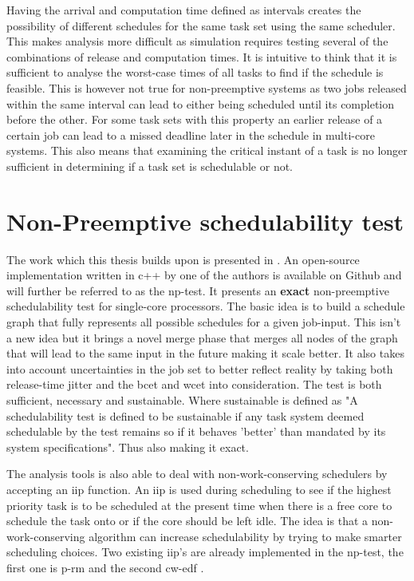 \documentclass{kththesis}
\begin{document}
Having the arrival and computation time defined as intervals creates the possibility of different
schedules for the same task set using the same scheduler. This makes analysis more difficult as
simulation requires testing several of the combinations of release and computation times. It is
intuitive to think that it is sufficient to analyse the worst-case times of all tasks to find if the
schedule is feasible. This is however not true for non-preemptive systems as two jobs released
within the same interval can lead to either being scheduled until its completion before the other.
For some task sets with this property an earlier release of a certain job can lead to a missed
deadline later in the schedule in multi-core systems. This also means that examining the critical
instant of a task is no longer sufficient in determining if a task set is schedulable or not.


\section{Non-Preemptive schedulability test} \label{sec:np-test}

The work which this thesis builds upon is presented in \parencite{nasri_exact_2017}. An open-source
implementation written in c++ by one of the authors is available on
Github\parencite{brandenburg_implementation_2018} and will further be referred to as the
\acrfull{np}-test. It presents an \textbf{exact} non-preemptive schedulability test for single-core
processors. The basic idea is to build a schedule graph that fully represents all possible schedules
for a given job-input. This isn't a new idea but it brings a novel merge phase that merges all nodes
of the graph that will lead to the same input in the future making it scale better. It also takes
into account uncertainties in the job set to better reflect reality by taking both release-time
jitter and the \acrshort{bcet} and \acrshort{wcet} into consideration. The test is both sufficient, 
necessary and sustainable. Where sustainable is defined as "A schedulability test is defined to
be sustainable if any task system deemed schedulable by the test remains so if it behaves 'better' than
mandated by its system specifications"\parencite{baruah_sustainable_2006}. Thus also making it exact.

The analysis tools is also able to deal with non-work-conserving schedulers by accepting an
\acrshort{iip} function. An \acrfull{iip} is used during scheduling to see if the highest priority
task is to be scheduled at the present time when there is a free core to schedule the task onto or
if the core should be left idle. The idea is that a non-work-conserving algorithm can increase
schedulability by trying to make smarter scheduling choices. Two existing \acrshort{iip}'s are
already implemented in the \acrshort{np}-test, the first one is \acrfull{p-rm}
\parencite{nasri_precautious-rm:_2014} and the second \acrfull{cw-edf}
\parencite{nasri_non-work-conserving_2016}.
\end{document}
